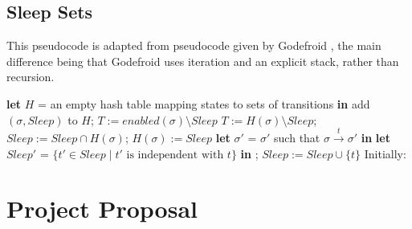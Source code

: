 \documentclass[12pt,a4paper,twoside,openright]{report}
\newcommand{\Let}[2]{\State \textbf{let} #1 = #2 \textbf{in}}
\begin{document}
\section{Sleep Sets}
\label{sapp:sleep-code}

This pseudocode is adapted from pseudocode
given by Godefroid \cite{god96}, the main
difference being that Godefroid uses
iteration and an explicit stack, rather
than recursion.
\smallskip
\begin{algorithmic}[1]
	\Let{$H$}{an empty hash table mapping
		states to sets of transitions}
	\State
	\State add $(\sigma, \textit{Sleep})$ to $H$;
	\State$T := \textit{enabled}(\sigma)
	\setminus \textit{Sleep}$
	\Else
	\State$T := H(\sigma) \setminus
	\textit{Sleep}$;
	\State $\textit{Sleep} := \textit{Sleep}
	\cap H(\sigma)$;
	\State $H(\sigma) := \textit{Sleep}$
	\EndIf
	\Let{$\sigma'$}{$\sigma'$ such that
		$\sigma \xrightarrow{t} \sigma'$}
	\Let{$\textit{Sleep}'$}{$\{t' \in \textit{Sleep}
		\mid t' \text{ is independent with } t\}$}
	\State{};
	\State $\textit{Sleep} := \textit{Sleep} \cup \{t\}$
	\EndFor
	\EndProcedure
	\State
	\State Initially: 
\end{algorithmic}

\chapter{Project Proposal}


\end{document}
